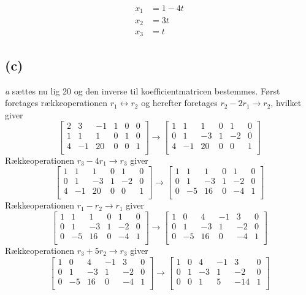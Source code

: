 \documentclass[12pt]{article}
\begin{document}
\begin{align*}
x_1&=1-4t\\
x_2&=3t\\
x_3&=t
\end{align*}

\subsection{(c)}
\textit{a} sættes nu lig 20 og den inverse til koefficientmatricen bestemmes. 
Først foretages rækkeoperationen $r_1 \leftrightarrow r_2 $ og herefter foretages $r_2-2r_1 \to r_2$, hvilket giver\\
$$
\left[\begin{array}{rrr|rrr}
2&3&-1&1&0&0\\
1&1&1&0&1&0\\
4&-1&20&0&0&1\\
\end{array}\right]
\to
\left[\begin{array}{rrr|rrr}
1&1&1&0&1&0\\
0&1&-3&1&-2&0\\
4&-1&20&0&0&1\\
\end{array}\right]
$$
Rækkeoperationen $r_3-4r_1 \to r_3$ giver
$$
\left[\begin{array}{rrr|rrr}
1&1&1&0&1&0\\
0&1&-3&1&-2&0\\
4&-1&20&0&0&1\\
\end{array}\right]
\to
\left[\begin{array}{rrr|rrr}
1&1&1&0&1&0\\
0&1&-3&1&-2&0\\
0&-5&16&0&-4&1\\
\end{array}\right]
$$
Rækkeoperationen $r_1-r_2 \to r_1$ giver
$$
\left[\begin{array}{rrr|rrr}
1&1&1&0&1&0\\
0&1&-3&1&-2&0\\
0&-5&16&0&-4&1\\
\end{array}\right]
\to
\left[\begin{array}{rrr|rrr}
1&0&4&-1&3&0\\
0&1&-3&1&-2&0\\
0&-5&16&0&-4&1\\
\end{array}\right]
$$
Rækkeoperationen $r_3+5r_2 \to r_3$ giver
$$
\left[\begin{array}{rrr|rrr}
1&0&4&-1&3&0\\
0&1&-3&1&-2&0\\
0&-5&16&0&-4&1\\
\end{array}\right]
\to
\left[\begin{array}{rrr|rrr}
1&0&4&-1&3&0\\
0&1&-3&1&-2&0\\
0&0&1&5&-14&1\\
\end{array}\right]
$$
\end{document}
